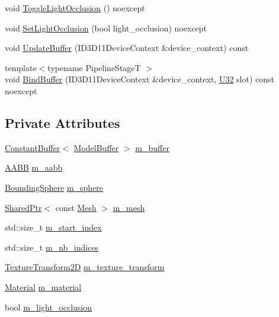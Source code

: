 \begin{DoxyCompactItemize}
void \mbox{\hyperlink{classmage_1_1rendering_1_1_model_ade8576cf32210153e65cd39b21940a67}{Toggle\+Light\+Occlusion}} () noexcept
\item 
void \mbox{\hyperlink{classmage_1_1rendering_1_1_model_a4064c86786e7dca7907435da1dce83a4}{Set\+Light\+Occlusion}} (bool light\+\_\+occlusion) noexcept
\item 
void \mbox{\hyperlink{classmage_1_1rendering_1_1_model_a31b3d4f544c8cfea4ad2054d594b2c53}{Update\+Buffer}} (I\+D3\+D11\+Device\+Context \&device\+\_\+context) const
\item 
{\footnotesize template$<$typename Pipeline\+StageT $>$ }\\void \mbox{\hyperlink{classmage_1_1rendering_1_1_model_a1247b104dff5f0eb1039b6e3ac0213ae}{Bind\+Buffer}} (I\+D3\+D11\+Device\+Context \&device\+\_\+context, \mbox{\hyperlink{namespacemage_aa5d6eaabaac3cdd01873d6a3d27e90f3}{U32}} slot) const noexcept
\end{DoxyCompactItemize}
\subsection*{Private Attributes}
\begin{DoxyCompactItemize}
\item 
\mbox{\hyperlink{classmage_1_1rendering_1_1_constant_buffer}{Constant\+Buffer}}$<$ \mbox{\hyperlink{structmage_1_1rendering_1_1_model_buffer}{Model\+Buffer}} $>$ \mbox{\hyperlink{classmage_1_1rendering_1_1_model_a82132035b4631143bed489c4bc190f95}{m\+\_\+buffer}}
\item 
\mbox{\hyperlink{classmage_1_1_a_a_b_b}{A\+A\+BB}} \mbox{\hyperlink{classmage_1_1rendering_1_1_model_a7b3bb86ad718ba3dae2b1c6042fdeaec}{m\+\_\+aabb}}
\item 
\mbox{\hyperlink{classmage_1_1_bounding_sphere}{Bounding\+Sphere}} \mbox{\hyperlink{classmage_1_1rendering_1_1_model_a88220cb828f0df79489c512245560616}{m\+\_\+sphere}}
\item 
\mbox{\hyperlink{namespacemage_a1e01ae66713838a7a67d30e44c67703e}{Shared\+Ptr}}$<$ const \mbox{\hyperlink{classmage_1_1rendering_1_1_mesh}{Mesh}} $>$ \mbox{\hyperlink{classmage_1_1rendering_1_1_model_a38be646490affe6bd2f2f2bb61d04caa}{m\+\_\+mesh}}
\item 
std\+::size\+\_\+t \mbox{\hyperlink{classmage_1_1rendering_1_1_model_ae92a44ede07f136ac89b25c34a8716cc}{m\+\_\+start\+\_\+index}}
\item 
std\+::size\+\_\+t \mbox{\hyperlink{classmage_1_1rendering_1_1_model_afc57d62ba9abcc13bce10f96ec9b2a03}{m\+\_\+nb\+\_\+indices}}
\item 
\mbox{\hyperlink{classmage_1_1_texture_transform2_d}{Texture\+Transform2D}} \mbox{\hyperlink{classmage_1_1rendering_1_1_model_a07ff69fff5b547729b517b2dbed34d02}{m\+\_\+texture\+\_\+transform}}
\item 
\mbox{\hyperlink{classmage_1_1rendering_1_1_material}{Material}} \mbox{\hyperlink{classmage_1_1rendering_1_1_model_a933d2f661f511908e7c1e9030cfc777d}{m\+\_\+material}}
\item 
bool \mbox{\hyperlink{classmage_1_1rendering_1_1_model_a796fd0c51ea194826dde990b10e70856}{m\+\_\+light\+\_\+occlusion}}
\end{DoxyCompactItemize}

